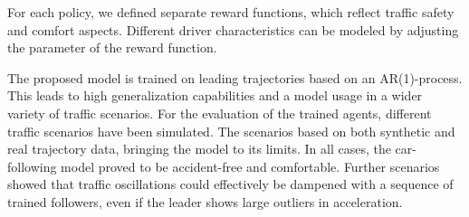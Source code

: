 \documentclass[review]{elsarticle}
\providecommand{\3}{{\ss}}
\begin{document}
For each policy, we defined separate reward functions, which reflect traffic safety and comfort aspects. 
Different driver characteristics can be modeled by adjusting the parameter of the reward function.

The proposed model is trained on leading trajectories based on an AR(1)-process. This leads to high generalization capabilities and a model usage in a wider variety of traffic scenarios. 
For the evaluation of the trained agents, different traffic scenarios
have been simulated. The scenarios based on both synthetic and
real trajectory data, bringing the model to its limits. 
In all cases, the car-following model proved to be accident-free and comfortable. Further scenarios showed that traffic oscillations could effectively be dampened with a sequence of trained followers, even if the leader shows large outliers in acceleration.





\end{document}
